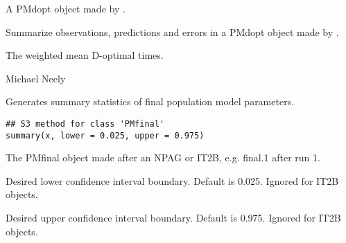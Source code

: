 \documentclass[a4paper]{book}
\begin{document}
%
\begin{Arguments}
\begin{ldescription}
\item[\code{x}] A PMdopt object made by .
\end{ldescription}
\end{Arguments}
%
\begin{Details}\relax
Summarize observations, predictions and errors in a PMdopt object made by .
\end{Details}
%
\begin{Value}
The weighted mean D-optimal times.
\end{Value}
%
\begin{Author}\relax
Michael Neely
\end{Author}
%
\begin{SeeAlso}\relax
{}
\end{SeeAlso}
%
\begin{Description}\relax
Generates summary statistics of final population model parameters.
\end{Description}
%
\begin{Usage}
\begin{verbatim}
## S3 method for class 'PMfinal'
summary(x, lower = 0.025, upper = 0.975)
\end{verbatim}
\end{Usage}
%
\begin{Arguments}
\begin{ldescription}
\item[\code{x}] The PMfinal object made after an NPAG or IT2B, e.g. final.1 after run 1.

\item[\code{lower}] Desired lower confidence interval boundary.  Default is 0.025. Ignored for IT2B objects.

\item[\code{upper}] Desired upper confidence interval boundary.  Default is 0.975. Ignored for IT2B objects.
\end{ldescription}
\end{Arguments}
%
\end{document}
